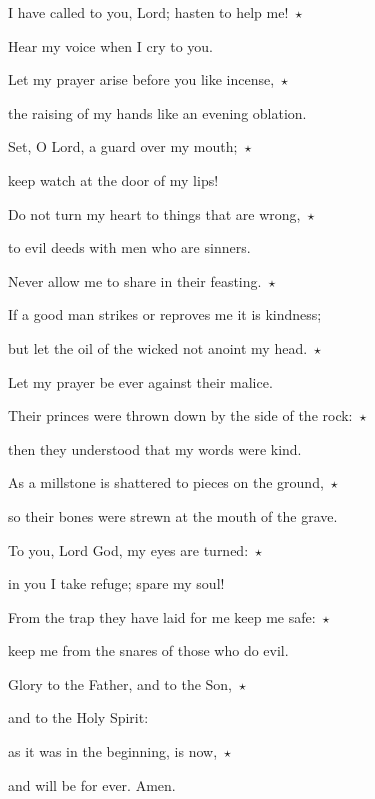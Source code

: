 \noindent I have called to you, Lord; hasten to help me!~$\star$~\nopagebreak

Hear my voice when I cry to you.

\noindent Let my prayer arise before you like incense,~$\star$~\nopagebreak

the raising of my hands like an evening oblation.

\noindent Set, O Lord, a guard over my mouth;~$\star$~\nopagebreak

keep watch at the door of my lips!

\noindent Do not turn my heart to things that are wrong,~$\star$~\nopagebreak

to evil deeds with men who are sinners.

\noindent Never allow me to share in their feasting.~$\star$~\nopagebreak

If a good man strikes or reproves me it is kindness;

\noindent but let the oil of the wicked not anoint my head.~$\star$~\nopagebreak

Let my prayer be ever against their malice.

\noindent Their princes were thrown down by the side of the rock:~$\star$~\nopagebreak

then they understood that my words were kind.

\noindent As a millstone is shattered to pieces on the ground,~$\star$~\nopagebreak

so their bones were strewn at the mouth of the grave.

\noindent To you, Lord God, my eyes are turned:~$\star$~\nopagebreak

in you I take refuge; spare my soul!

\noindent From the trap they have laid for me keep me safe:~$\star$~\nopagebreak

keep me from the snares of those who do evil.

\noindent Glory to the Father, and to the Son,~$\star$~\nopagebreak

and to the Holy Spirit:

\noindent as it was in the beginning, is now,~$\star$~\nopagebreak

and will be for ever. Amen.
